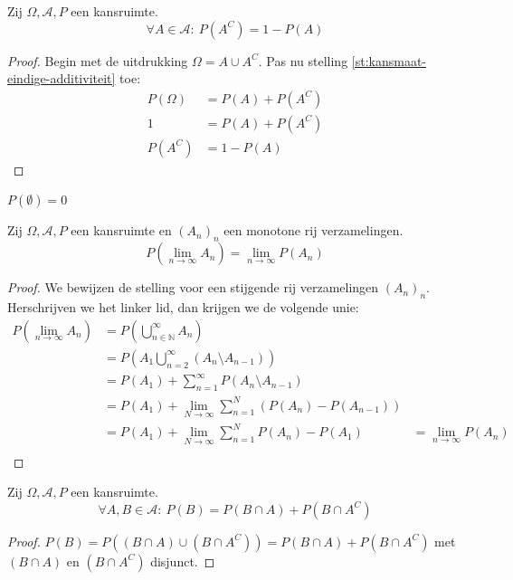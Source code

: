 \documentclass[main.tex]{subfiles}
\begin{document}
\begin{st}
  Zij $\Omega,\mathcal{A},P$ een kansruimte.
  \[ \forall A \in \mathcal{A}:\ P(A^{C}) = 1 - P(A) \]

  \begin{proof}
    Begin met de uitdrukking $\Omega = A \cup A^{C}$.
    Pas nu stelling \ref{st:kansmaat-eindige-additiviteit} toe:
    \[
    \begin{array}{rl}
      P(\Omega) &= P(A) + P(A^{C})\\
      1         &= P(A) + P(A^{C})\\
      P(A^{C})  &= 1-P(A)
    \end{array}
    \]
  \end{proof}
\end{st}

\begin{gev}
  $P(\emptyset) = 0$
\end{gev}

\begin{st}
  Zij $\Omega,\mathcal{A},P$ een kansruimte en $(A_{n})_{n}$ een monotone rij verzamelingen.
  \[ P\left( \lim_{n\rightarrow \infty}A_{n} \right) = \lim_{n\rightarrow \infty}P(A_{n}) \]

  \begin{proof}
    We bewijzen de stelling voor een stijgende rij verzamelingen $(A_{n})_{n}$.
    Herschrijven we het linker lid, dan krijgen we de volgende unie:
    \[
    \begin{array}{rll}
      P\left( \lim_{n\rightarrow \infty}A_{n} \right) &= P \left( \bigcup_{n\in \mathbb{N}}^{\infty}A_{n} \right)\\
                                                &= P \left( A_{1} \bigcup_{n=2}^{\infty}(A_{n} \setminus A_{n-1}) \right)\\
                                                &= P(A_{1}) + \sum_{n=1}^{\infty}P(A_{n}\setminus A_{n-1})\\
                                                &= P(A_{1}) + \lim_{N \rightarrow \infty}\sum_{n=1}^{N}(P(A_{n}) - P(A_{n-1}))\\
                                                &= P(A_{1}) + \lim_{N \rightarrow \infty}\sum_{n=1}^{N}P(A_{n}) - P(A_{1}) &= \lim_{n\rightarrow \infty}P(A_{n})\\
    \end{array}
    \]
  \end{proof}
\end{st}

\begin{ei}
  Zij $\Omega,\mathcal{A},P$ een kansruimte.
  \[ \forall A,B \in \mathcal{A}:\ P(B) = P(B \cap A) + P(B \cap A^{C}) \]

  \begin{proof}
    $P(B) = P((B \cap A) \cup (B \cap A^{C})) = P(B \cap A) + P(B \cap A^{C})$ met $(B \cap A)$ en $(B \cap A^{C})$ disjunct.
  \end{proof}
\end{ei}
\end{document}
